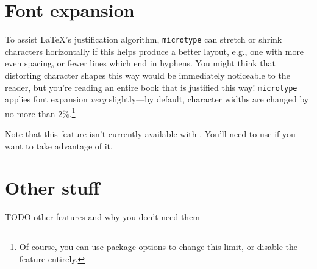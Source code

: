 \section{Font expansion}

To assist \LaTeX's justification algorithm,
\texttt{microtype} can
stretch or shrink characters horizontally if
this helps produce a better layout, e.g.,
one with more even spacing, or fewer lines which end in hyphens.
You might think that distorting character shapes this way would be immediately
noticeable to the reader,
but you're reading an entire book that is justified this way!
\texttt{microtype} applies font expansion \emph{very} slightly---by default,
character widths are changed by no more than 2\%.\punckern\footnote{Of course,
you can use package options to change this limit,
or disable the feature entirely.}

Note that this feature isn't currently available with \XeLaTeX{}.
You'll need to use \LuaLaTeX{} if you want to take advantage of it.

\section{Other stuff}

TODO other features and why you don't need them
